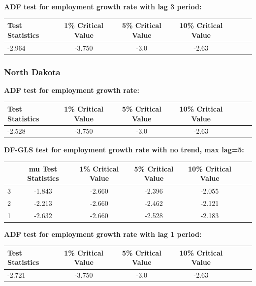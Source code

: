 \documentclass{article}
\begin{document}
\vspace{0.5cm}

\noindent \textbf{ADF test for employment growth rate with lag 3 period: }
\begin{center}
\resizebox{13cm}{!}
{
\begin{tabular}{lcccccc} \hline
    Test Statistics & 1\% Critical Value& 5\% Critical Value & 10\% Critical Value \\ \hline
    -2.964 & -3.750 & -3.0 & -2.63 \\ \hline
\end{tabular}
}
\end{center}

\vspace{0.5cm}


\subsubsection{North Dakota}
\noindent \textbf{ADF test for employment growth rate: }
\begin{center}
    \resizebox{13cm}{!}
    {
    \begin{tabular}{lcccccc} \hline
        Test Statistics & 1\% Critical Value& 5\% Critical Value & 10\% Critical Value \\ \hline
        -2.528 & -3.750 & -3.0 & -2.63 \\ \hline
    \end{tabular}
    }
\end{center}

\vspace{0.5cm}

\noindent \textbf{DF-GLS test for employment growth rate with no trend, max lag=5:}
\begin{center}
\resizebox{13cm}{!}
{
\begin{tabular}{lcccccc} \hline
    [lags] & mu Test Statistics & 1\% Critical Value& 5\% Critical Value & 10\% Critical Value \\ \hline
    3      & -1.843 & -2.660 & -2.396 & -2.055 \\ 
    2      & -2.213 & -2.660 & -2.462 & -2.121 \\
    1      & -2.632 & -2.660 & -2.528 & -2.183 \\ \hline
\end{tabular}
}
\end{center}

\vspace{0.5cm}

\noindent \textbf{ADF test for employment growth rate with lag 1 period: }
\begin{center}
\resizebox{13cm}{!}
{
\begin{tabular}{lcccccc} \hline
    Test Statistics & 1\% Critical Value& 5\% Critical Value & 10\% Critical Value \\ \hline
    -2.721 & -3.750 & -3.0 & -2.63 \\ \hline
\end{tabular}
}
\end{center}
\end{document}
